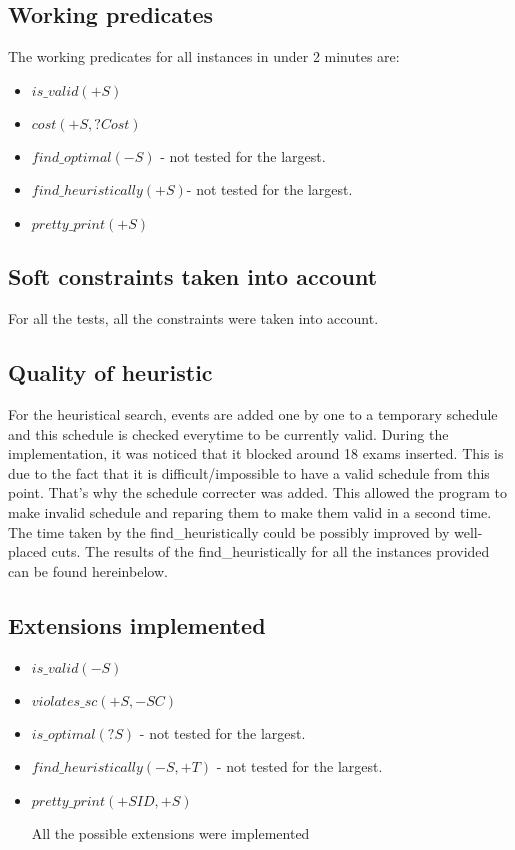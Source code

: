\documentclass[a4paper]{article}
\begin{document}
\subsection{Working predicates}
The working predicates for all instances in under 2 minutes are:
\begin{itemize}
\item $is\_valid(+S)$
\item $cost(+S, ?Cost)$
\item $find\_optimal(-S)$ - not tested for the largest.
\item $find\_heuristically(+S)$- not tested for the largest.
\item $pretty\_print(+S)$

\end{itemize}

\subsection{Soft constraints taken into account}
For all the tests, all the constraints were taken into account.

\subsection{Quality of heuristic}
For the heuristical search, events are added one by one to a temporary schedule and this schedule is checked everytime to be currently valid. During the implementation, it was noticed that it blocked around 18 exams inserted. This is due to the fact that it is difficult/impossible to have a valid schedule from this point. That's why the schedule correcter was added. This allowed the program to make invalid schedule and reparing them to make them valid in a second time. The time taken by the find\_heuristically could be possibly improved by well-placed cuts. 
The results of the find\_heuristically for all the instances provided can be found hereinbelow.
\subsection{Extensions implemented}
\begin{itemize}
\item $is\_valid(-S)$
\item $violates\_sc(+S, -SC)$
\item $is\_optimal(?S)$ - not tested for the largest.
\item $find\_heuristically(-S, +T)$ - not tested for the largest.
\item $pretty\_print(+SID, +S)$

All the possible extensions were implemented
\end{itemize}
\end{document}
